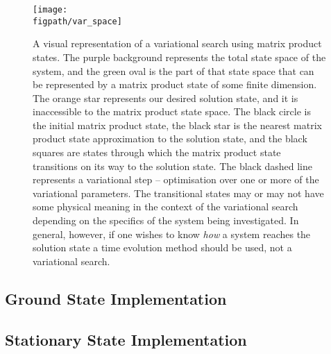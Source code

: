 \begin{figure}
\centering
\texttt{[image: \\figpath/var\_space]}
\caption{A visual representation of a variational search using matrix product states. The purple background represents the total state space of the system, and the green oval is the part of that state space that can be represented by a matrix product state of some finite dimension. The orange star represents our desired solution state, and it is inaccessible to the matrix product state space. The black circle is the initial matrix product state, the black star is the nearest matrix product state approximation to the solution state, and the black squares are states through which the matrix product state transitions on its way to the solution state. The black dashed line represents a variational step -- optimisation over one or more of the variational parameters. The transitional states may or may not have some physical meaning in the context of the variational search depending on the specifics of the system being investigated. In general, however, if one wishes to know \emph{how} a system reaches the solution state a time evolution method should be used, not a variational search.}
\label{fig:vs1-1}
\end{figure}
 
 \subsection{Ground State Implementation}
 
 \subsection{Stationary State Implementation}